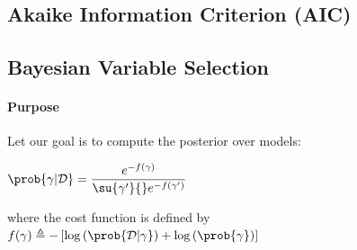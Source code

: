 \subsection{Akaike Information Criterion (AIC)}


\subsection{Bayesian Variable Selection}
\paragraph{Purpose}
Let  our goal is to compute the posterior over models:
\begin{center}
    $\prob{\gamma|\mathcal{D}} = \dfrac{e^{-f(\gamma)}}{\su{\gamma'}{}e^{-f(\gamma')}}$
\end{center}
where the cost function is defined by $f(\gamma) \triangleq -\left[\log\left(\prob{
\mathcal{D}|\gamma}\right) + \log\left(\prob{\gamma}\right)\right]$

